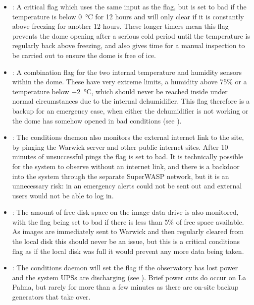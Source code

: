 \begin{colsection}
\begin{itemize}
    \item {}: A critical flag which uses the same input as the  flag, but is set to bad if the temperature is below \SI{0}{\celsius} for 12 hours and will only clear if it is constantly above freezing for another 12 hours. These longer timers mean this flag prevents the dome opening after a serious cold period until the temperature is regularly back above freezing, and also gives time for a manual inspection to be carried out to ensure the dome is free of ice.

    \item {}: A combination flag for the two internal temperature and humidity sensors within the dome. These have very extreme limits, a humidity above 75\% or a temperature below \SI{-2}{\celsius}, which should never be reached inside under normal circumstances due to the internal dehumidifier. This flag therefore is a backup for an emergency case, when either the dehumidifier is not working or the dome has somehow opened in bad conditions (see ).

    \item {}: The conditions daemon also monitors the external internet link to the site, by pinging the Warwick server and other public internet sites. After 10 minutes of unsuccessful pings the flag is set to bad. It is technically possible for the system to observe without an internet link, and there is a backdoor into the system through the separate SuperWASP network, but it is an unnecessary risk: in an emergency alerts could not be sent out and external users would not be able to log in.

    \item {}: The amount of free disk space on the image data drive is also monitored, with the flag being set to bad if there is less than 5\% of free space available. As images are immediately sent to Warwick and then regularly cleared from the local disk this should never be an issue, but this is a critical conditions flag as if the local disk was full it would prevent any more data being taken.

    \item {}: The conditions daemon will set the  flag if the observatory has lost power and the system UPSs are discharging (see ). Brief power cuts do occur on La Palma, but rarely for more than a few minutes as there are on-site backup generators that take over.


\end{itemize}
\end{colsection}

